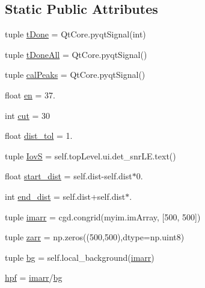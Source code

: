 \subsection*{Static Public Attributes}
\begin{DoxyCompactItemize}
\item 
tuple \hyperlink{classmy_detector_1_1my_detector_a83320d2b6159a6b1bc8c053dbfff9bd7}{t\-Done} = Qt\-Core.\-pyqt\-Signal(int)
\item 
tuple \hyperlink{classmy_detector_1_1my_detector_a22ed0aa2e098b8d4d99aefda27475b0d}{t\-Done\-All} = Qt\-Core.\-pyqt\-Signal()
\item 
tuple \hyperlink{classmy_detector_1_1my_detector_a56d596ddc38ea76426625c66e958f597}{cal\-Peaks} = Qt\-Core.\-pyqt\-Signal()
\item 
float \hyperlink{classmy_detector_1_1my_detector_a2e2dfccba7a271626bf2569bcd4230f0}{en} = 37.
\item 
int \hyperlink{classmy_detector_1_1my_detector_ae401cd79076e16e17387d857aa582485}{cut} = 30
\item 
float \hyperlink{classmy_detector_1_1my_detector_a52b6987c8b523fb62551aef4c8915c70}{dist\-\_\-tol} = 1.
\item 
tuple \hyperlink{classmy_detector_1_1my_detector_a47317ecbf510f2824ec6cde297d1b49e}{Iov\-S} = self.\-top\-Level.\-ui.\-det\-\_\-snr\-L\-E.\-text()
\item 
float \hyperlink{classmy_detector_1_1my_detector_a236fc1245269dda1ad8eb67c429d4ea7}{start\-\_\-dist} = self.\-dist-\/self.\-dist$\ast$0.
\item 
int \hyperlink{classmy_detector_1_1my_detector_ad533e746d764e752d9e0d29624b5b8ea}{end\-\_\-dist} = self.\-dist+self.\-dist$\ast$.
\item 
tuple \hyperlink{classmy_detector_1_1my_detector_a410f74814a76fe6a1def53b340335fa7}{imarr} = cgd.\-congrid(myim.\-im\-Array, \mbox{[}500, 500\mbox{]})
\item 
tuple \hyperlink{classmy_detector_1_1my_detector_a5073be601ea77b2b69921ccf0de09f95}{zarr} = np.\-zeros((500,500),dtype=np.\-uint8)
\item 
tuple \hyperlink{classmy_detector_1_1my_detector_aab7c6d5294ad55f8124b65bbfbb2a5c8}{bg} = self.\-local\-\_\-background(\hyperlink{classmy_detector_1_1my_detector_a410f74814a76fe6a1def53b340335fa7}{imarr})
\item 
\hyperlink{classmy_detector_1_1my_detector_a8d151e9e0479b3bed1067c7f3bcf35e0}{hpf} = \hyperlink{classmy_detector_1_1my_detector_a410f74814a76fe6a1def53b340335fa7}{imarr}/\hyperlink{classmy_detector_1_1my_detector_aab7c6d5294ad55f8124b65bbfbb2a5c8}{bg}

\end{DoxyCompactItemize}
